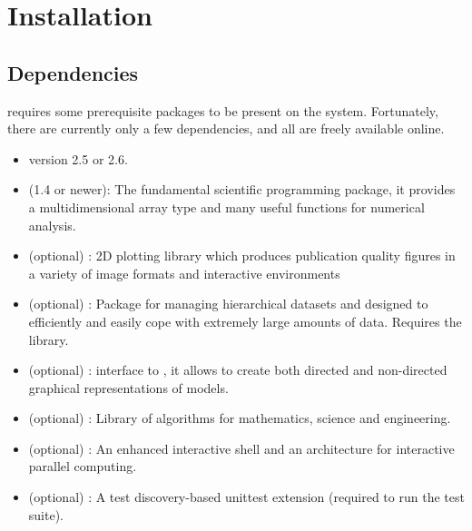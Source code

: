 \documentclass[]{jss}
\begin{document}
\section[Installation]{Installation}
\label{chap:install}


\subsection{Dependencies}
  \label{dependencies}%


 requires some prerequisite packages to be present on the system.
Fortunately, there are currently only a few dependencies, and all are
freely available online.
%
\begin{itemize}

\item {} version 2.5 or 2.6.

\item {} (1.4 or newer): The fundamental scientific programming package, it provides a
multidimensional array type and many useful functions for numerical analysis.

\item {} \citep{matplotlib} (optional) : 2D plotting library which produces publication
quality figures in a variety of image formats and interactive environments

\item {} \citep{tables} (optional) : Package for managing hierarchical datasets and
designed to efficiently and easily cope with extremely large amounts of data.
Requires the  library.

\item {} \citep{pydot} (optional) :  interface to  \citep{graphviz}, it allows
 to create both directed and non-directed graphical representations of models.

\item {} \citep{scipy} (optional) : Library of algorithms for mathematics, science
and engineering.

\item {} \citep{ipython}  (optional) : An enhanced interactive  shell and an
architecture for interactive parallel computing.

\item {} \citep{nose} (optional) : A test discovery-based unittest extension (required to run the test suite).

\end{itemize}
\end{document}

